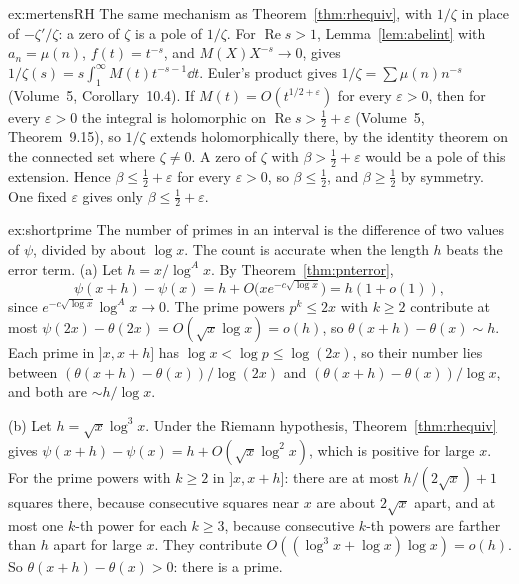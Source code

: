 \begin{solution}{ex:mertensRH}
\idea The same mechanism as Theorem~\ref{thm:rhequiv}, with $1/\zeta$ in place of $-\zeta'/\zeta$: a zero of $\zeta$ is a pole of $1/\zeta$.
\writeup For $\operatorname{Re}s>1$, Lemma~\ref{lem:abelint} with $a_n=\mu(n)$, $f(t)=t^{-s}$, and $M(X)X^{-s}\to0$, gives $1/\zeta(s)=s\int_1^\infty M(t)t^{-s-1}\dd t$. Euler's product gives $1/\zeta=\sum\mu(n)n^{-s}$ (Volume~5, Corollary~10.4). If $M(t)=O(t^{1/2+\varepsilon})$ for every $\varepsilon>0$, then for every $\varepsilon>0$ the integral is holomorphic on $\operatorname{Re}s>\frac12+\varepsilon$ (Volume~5, Theorem~9.15), so $1/\zeta$ extends holomorphically there, by the identity theorem on the connected set where $\zeta\ne0$. A zero of $\zeta$ with $\beta>\frac12+\varepsilon$ would be a pole of this extension. Hence $\beta\le\frac12+\varepsilon$ for every $\varepsilon>0$, so $\beta\le\frac12$, and $\beta\ge\frac12$ by symmetry. One fixed $\varepsilon$ gives only $\beta\le\frac12+\varepsilon$.
\end{solution}

\begin{solution}{ex:shortprime}
\idea The number of primes in an interval is the difference of two values of $\psi$, divided by about $\log x$. The count is accurate when the length $h$ beats the error term.
\writeup (a) Let $h=x/\log^Ax$. By Theorem~\ref{thm:pnterror},
\[
\psi(x+h)-\psi(x)=h+O\bigl(xe^{-c\sqrt{\log x}}\bigr)=h(1+o(1)),
\]
since $e^{-c\sqrt{\log x}}\log^Ax\to0$. The prime powers $p^k\le2x$ with $k\ge2$ contribute at most $\psi(2x)-\theta(2x)=O(\sqrt x\log x)=o(h)$, so $\theta(x+h)-\theta(x)\sim h$. Each prime in $]x,x+h]$ has $\log x<\log p\le\log(2x)$, so their number lies between $(\theta(x+h)-\theta(x))/\log(2x)$ and $(\theta(x+h)-\theta(x))/\log x$, and both are $\sim h/\log x$.

(b) Let $h=\sqrt x\log^3x$. Under the Riemann hypothesis, Theorem~\ref{thm:rhequiv} gives $\psi(x+h)-\psi(x)=h+O(\sqrt x\log^2x)$, which is positive for large $x$. For the prime powers with $k\ge2$ in $]x,x+h]$: there are at most $h/(2\sqrt x)+1$ squares there, because consecutive squares near $x$ are about $2\sqrt x$ apart, and at most one $k$-th power for each $k\ge3$, because consecutive $k$-th powers are farther than $h$ apart for large $x$. They contribute $O((\log^3x+\log x)\log x)=o(h)$. So $\theta(x+h)-\theta(x)>0$: there is a prime.
\end{solution}

